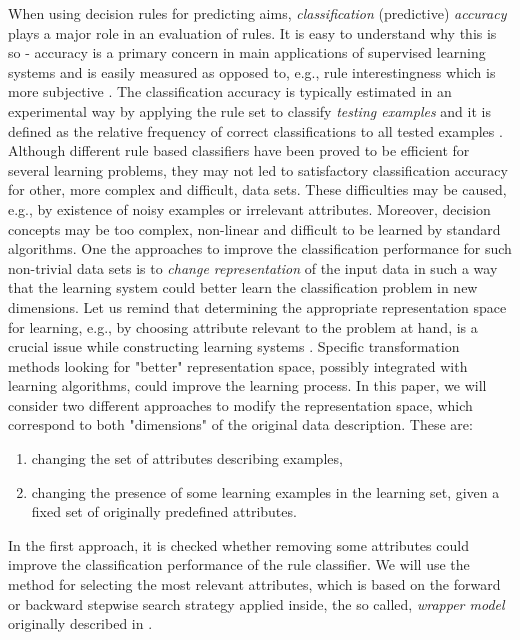\documentclass{elsart}
\begin{document}
When using decision rules for predicting aims, \emph{classification}
(predictive) \emph{accuracy} plays a major role in an evaluation of rules.
It is easy to understand why this is so - accuracy is a primary concern in
main applications of supervised learning systems and is easily measured as
opposed to, e.g., rule interestingness which is more subjective \cite{Q96}.
The classification accuracy is typically estimated in an experimental way by
applying the rule set to classify \emph{testing examples} and it is defined
as the relative frequency of correct classifications to all tested examples
\cite{Weiss}. Although different rule based classifiers have been proved to
be efficient for several learning problems, they may not led to satisfactory
classification accuracy for other, more complex and difficult, data sets.
These difficulties may be caused, e.g., by existence of noisy examples or
irrelevant attributes. Moreover, decision concepts may be too complex,
non-linear and difficult to be learned by standard algorithms. One the
approaches to improve the classification performance for such non-trivial
data sets is to \emph{change representation} of the input data in such a way
that the learning system could better learn the classification problem in
new dimensions. Let us remind that determining the appropriate
representation space for learning, e.g., by choosing attribute relevant to
the problem at hand, is a crucial issue while constructing learning systems
\cite{Kohavi94,MBK98}. Specific transformation methods looking for "better"
representation space, possibly integrated with learning algorithms, could
improve the learning process. In this paper, we will consider two different
approaches to modify the representation space, which correspond to both
"dimensions" of the original data description. These are:
\begin{enumerate}
\item changing the set of attributes describing examples,
\item changing the presence of some learning examples in the
learning set, given a fixed set of originally predefined
attributes.
\end{enumerate}

In the first approach, it is checked whether removing some attributes could
improve the classification performance of the rule classifier. We will use
the method for selecting the most relevant attributes, which is based on the
forward or backward stepwise search strategy applied inside, the so called,
{\em wrapper model} originally described in \cite{Kohavi94}.
\end{document}
